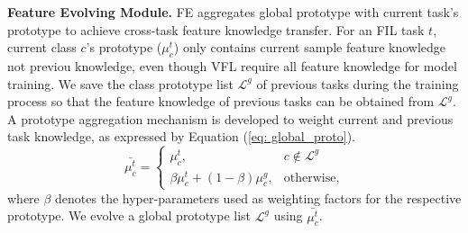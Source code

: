 \noindent\textbf{Feature Evolving Module.} FE aggregates global prototype with current task's prototype to achieve cross-task feature knowledge transfer.
For an FIL task $t$, current class $c$'s prototype ($\mu_{c}^t$) only contains current sample feature knowledge not previou knowledge, even though VFL require all feature knowledge for model training. 
We save the class prototype list $\mathcal{L}^g$ of previous tasks during the training process so that the feature knowledge of previous tasks can be obtained from $\mathcal{L}^g$.
A prototype aggregation mechanism is developed to weight current and previous task knowledge, as expressed by Equation (\ref{eq: global_proto}).
\begin{equation} \label{eq: global_proto}
    \bar{\mu_{c}^t}=\left\{\begin{array}{ll}
\mu_{c}^t, & c \notin \mathcal{L}^g \\
\beta \mu_{c}^t + (1-\beta) \mu_{c}^{g}, & \text {otherwise},
\end{array}\right.
\end{equation}
where $\beta$ denotes the hyper-parameters used as weighting factors for the respective prototype.
We evolve a global prototype list $\mathcal{L}^g$ using $\bar{\mu_{c}^t}$.
